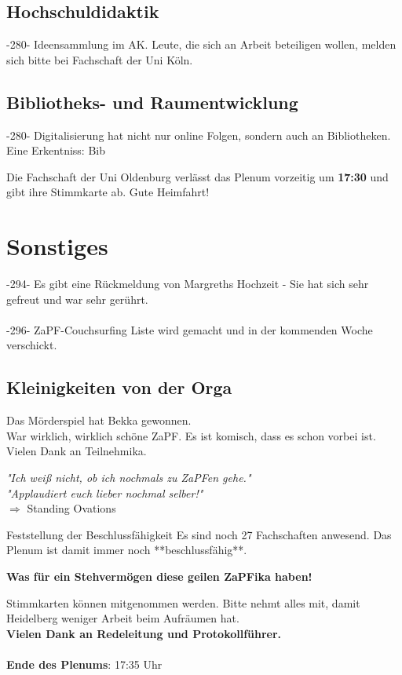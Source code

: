   \subsection{Hochschuldidaktik}
    -280- Ideensammlung im AK. Leute, die sich an Arbeit beteiligen wollen, melden sich bitte bei Fachschaft der Uni Köln.

  \subsection{Bibliotheks- und Raumentwicklung}
    -280- Digitalisierung hat nicht nur online Folgen, sondern auch an Bibliotheken. Eine Erkentniss: Bib

  \begin{info}{}
    Die Fachschaft der Uni Oldenburg verlässt das Plenum vorzeitig um \textbf{17:30} und gibt ihre Stimmkarte ab. Gute Heimfahrt!
  \end{info}

\section{Sonstiges}
    -294- Es gibt eine Rückmeldung von Margreths Hochzeit - Sie hat sich sehr gefreut und war sehr gerührt. \\ \\

    -296- ZaPF-Couchsurfing Liste wird gemacht und in der kommenden Woche verschickt.

  \subsection{Kleinigkeiten von der Orga}
    Das Mörderspiel hat Bekka gewonnen. \\

    War wirklich, wirklich schöne ZaPF. Es ist komisch, dass es schon vorbei ist.
    Vielen Dank an Teilnehmika. \\

    \begin{center}
      \textit{"Ich weiß nicht, ob ich nochmals zu ZaPFen gehe."} \\
      \textit{"Applaudiert euch lieber nochmal selber!"} \\
      $\Rightarrow$ Standing Ovations
    \end{center}

    \begin{success}{Feststellung der Beschlussfähigkeit}
      Es sind noch 27 Fachschaften anwesend.
      Das Plenum ist damit immer noch **beschlussfähig**.
      \begin{center}
        \textbf{Was für ein Stehvermögen diese geilen ZaPFika haben!}
      \end{center}
    \end{success}

    Stimmkarten können mitgenommen werden. Bitte nehmt alles mit, damit Heidelberg weniger Arbeit beim Aufräumen hat. \\

    \textbf{Vielen Dank an Redeleitung und Protokollführer.} \\ \\

    \textbf{Ende des Plenums}: 17:35 Uhr
